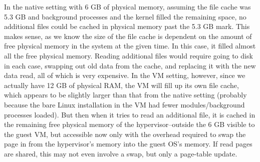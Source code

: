 \documentclass[letterpaper,twocolumn,10pt]{article}
\begin{document}
In the native setting with 6 GB of physical memory, assuming the file cache was 5.3 GB and background processes and the kernel filled the remaining space, no additional files could be cached in physical memory past the 5.3 GB mark. 
This makes sense, as we know the size of the file cache is dependent on the amount of free physical memory in the system at the given time. 
In this case, it filled almost all the free physical memory. 
Reading additional files would require going to disk in each case, swapping out old data from the cache, and replacing it with the new data read, all of which is very expensive. 
In the VM setting, however, since we actually have 12 GB of physical RAM, the VM will fill up its own file cache, which appears to be slightly larger than that from the native setting (probably because the bare Linux installation in the VM had fewer modules/background processes loaded). 
But then when it tries to read an additional file, it is cached in the remaining free physical memory of the hypervisor--outside the 6 GB visible to the guest VM, but accessible now only with the overhead required to swap the page in from the hypervisor's memory into the guest OS's memory. 
If read pages are shared, this may not even involve a swap, but only a page-table update. 
\end{document}

